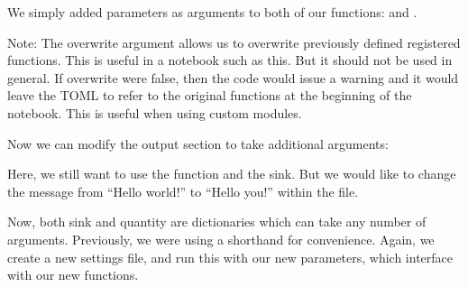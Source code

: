 \documentclass[letterpaper,10pt,english]{sphinxmanual}
\begin{document}
We simply added parameters as arguments to both of our functions:  and .

Note: The overwrite argument allows us to overwrite previously defined registered functions. This is useful in a notebook such as this. But it should not be used in general. If overwrite were false, then the code would issue a warning and it would leave the TOML to refer to the original functions at the beginning of the notebook. This is useful when using custom modules.

Now we can modify the output section to take additional arguments:

\begin{sphinxVerbatim}[commandchars=\\\{\}]
\PYG{p}{[}\PYG{p}{[}\PYG{p}{]}\PYG{p}{]}
  
  
  
  
  
  
\end{sphinxVerbatim}

Here, we still want to use the  function and the  sink. But we would like to change the message from “Hello world!” to “Hello you!” within the  file.

Now, both sink and quantity are dictionaries which can take any number of arguments. Previously, we were using a shorthand for convenience. Again, we create a new settings file, and run this with our new parameters, which interface with our new functions.
\end{document}
